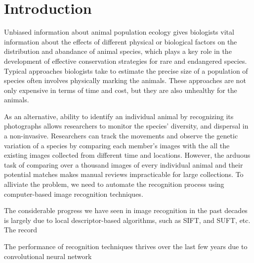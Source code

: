 
\chapter{Introduction}



Unbiased information about animal population ecology gives biologists vital information about the effects of different physical or biological factors on the distribution and abandance of animal species, which plays a key role in the development of effective conservation strategies for rare and endangered species. Typical approaches biologists take to estimate the precise size of a population of species often involves physically marking the animals. These approaches are not only expensive in terms of time and cost, but they are also unhealthy for the animals.

As an alternative, ability to identify an individual animal by recognizing its photographs allows researchers to monitor the species' diversity, and dispersal in a non-invasive. Researchers can track the movements and observe the genetic variation of a species by comparing each member's images with the all the existing images collected from different time and locations. However, the arduous task of comparing over a thousand images of every individual animal and their potential matches makes manual reviews impracticable for large collections. To alliviate the problem, we need to automate the recognition process using computer-based image recognition techniques.

The considerable progress we have seen in image recognition in the past decades is largely due to local descriptor-based algorithms, such as SIFT\cite{lowe04}, and SUFT\cite{surf08}, etc. The record 

The performance of recognition techniques thrives over the last few years due to convolutional neural network 


